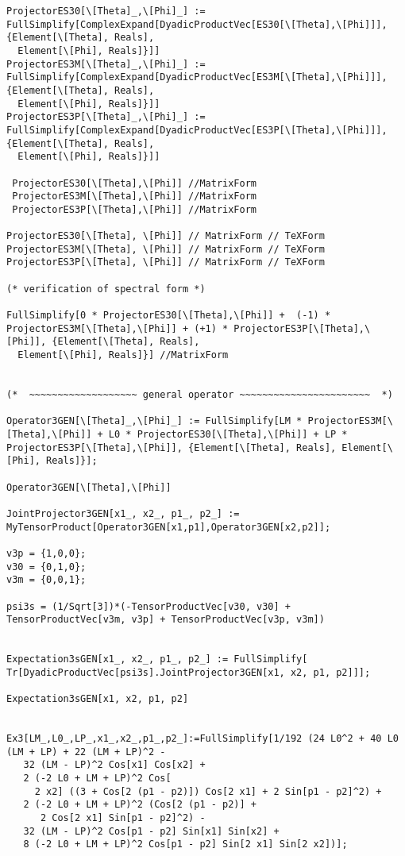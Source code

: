\documentclass[%
 showpacs,
 showkeys,
 preprintnumbers,
 amsmath,amssymb,
 aps,
  pra,
  longbibliography,
 floatfix,
 ]{revtex4-1}
\begin{document}
{\begin{lstlisting}[backgroundcolor=\color{yellow!10},framerule=0pt,breaklines=true, frame=tb]
ProjectorES30[\[Theta]_,\[Phi]_] := FullSimplify[ComplexExpand[DyadicProductVec[ES30[\[Theta],\[Phi]]], {Element[\[Theta], Reals],
  Element[\[Phi], Reals]}]]
ProjectorES3M[\[Theta]_,\[Phi]_] := FullSimplify[ComplexExpand[DyadicProductVec[ES3M[\[Theta],\[Phi]]], {Element[\[Theta], Reals],
  Element[\[Phi], Reals]}]]
ProjectorES3P[\[Theta]_,\[Phi]_] := FullSimplify[ComplexExpand[DyadicProductVec[ES3P[\[Theta],\[Phi]]], {Element[\[Theta], Reals],
  Element[\[Phi], Reals]}]]

 ProjectorES30[\[Theta],\[Phi]] //MatrixForm
 ProjectorES3M[\[Theta],\[Phi]] //MatrixForm
 ProjectorES3P[\[Theta],\[Phi]] //MatrixForm

ProjectorES30[\[Theta], \[Phi]] // MatrixForm // TeXForm
ProjectorES3M[\[Theta], \[Phi]] // MatrixForm // TeXForm
ProjectorES3P[\[Theta], \[Phi]] // MatrixForm // TeXForm

(* verification of spectral form *)

FullSimplify[0 * ProjectorES30[\[Theta],\[Phi]] +  (-1) * ProjectorES3M[\[Theta],\[Phi]] + (+1) * ProjectorES3P[\[Theta],\[Phi]], {Element[\[Theta], Reals],
  Element[\[Phi], Reals]}] //MatrixForm


(*  ~~~~~~~~~~~~~~~~~~~ general operator ~~~~~~~~~~~~~~~~~~~~~~~  *)

Operator3GEN[\[Theta]_,\[Phi]_] := FullSimplify[LM * ProjectorES3M[\[Theta],\[Phi]] + L0 * ProjectorES30[\[Theta],\[Phi]] + LP * ProjectorES3P[\[Theta],\[Phi]], {Element[\[Theta], Reals], Element[\[Phi], Reals]}];

Operator3GEN[\[Theta],\[Phi]]

JointProjector3GEN[x1_, x2_, p1_, p2_] :=  MyTensorProduct[Operator3GEN[x1,p1],Operator3GEN[x2,p2]];

v3p = {1,0,0};
v30 = {0,1,0};
v3m = {0,0,1};

psi3s = (1/Sqrt[3])*(-TensorProductVec[v30, v30] + TensorProductVec[v3m, v3p] + TensorProductVec[v3p, v3m])


Expectation3sGEN[x1_, x2_, p1_, p2_] := FullSimplify[ Tr[DyadicProductVec[psi3s].JointProjector3GEN[x1, x2, p1, p2]]];

Expectation3sGEN[x1, x2, p1, p2]


Ex3[LM_,L0_,LP_,x1_,x2_,p1_,p2_]:=FullSimplify[1/192 (24 L0^2 + 40 L0 (LM + LP) + 22 (LM + LP)^2 -
   32 (LM - LP)^2 Cos[x1] Cos[x2] +
   2 (-2 L0 + LM + LP)^2 Cos[
     2 x2] ((3 + Cos[2 (p1 - p2)]) Cos[2 x1] + 2 Sin[p1 - p2]^2) +
   2 (-2 L0 + LM + LP)^2 (Cos[2 (p1 - p2)] +
      2 Cos[2 x1] Sin[p1 - p2]^2) -
   32 (LM - LP)^2 Cos[p1 - p2] Sin[x1] Sin[x2] +
   8 (-2 L0 + LM + LP)^2 Cos[p1 - p2] Sin[2 x1] Sin[2 x2])];


\end{lstlisting}}
\end{document}
